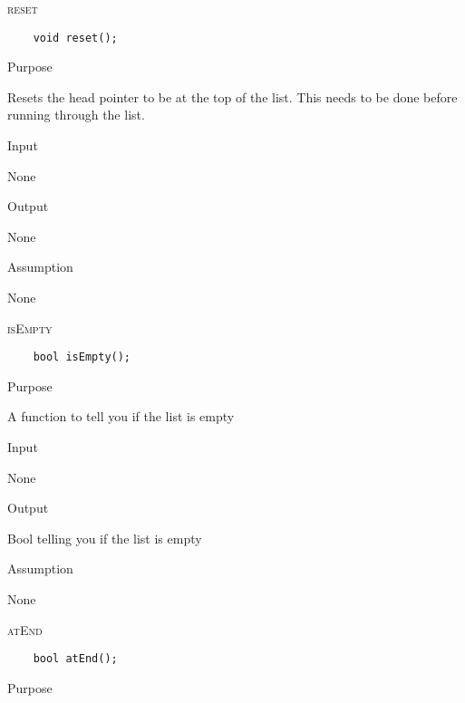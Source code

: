 \documentclass[pdftex, 11pt]{article}
\begin{document}
\begin{description}
	\item{\textsc{reset}}
\begin{lstlisting}
	void reset();
\end{lstlisting}

		\begin{description}

			\item{Purpose}

				Resets the head pointer to be at the top of the list. This needs to be done before running through the
				list.

			\item{Input}

				None

			\item{Output}

				None

			\item{Assumption}

				None

		\end{description}

	\item{\textsc{isEmpty}}
\begin{lstlisting}
	bool isEmpty();
\end{lstlisting}

		\begin{description}

			\item{Purpose}

				A function to tell you if the list is empty

			\item{Input}

				None

			\item{Output}

				Bool telling you if the list is empty

			\item{Assumption}

				None

		\end{description}

	\item{\textsc{atEnd}}
\begin{lstlisting}
	bool atEnd();
\end{lstlisting}

		\begin{description}

			\item{Purpose}


\end{description}
\end{description}
\end{document}
